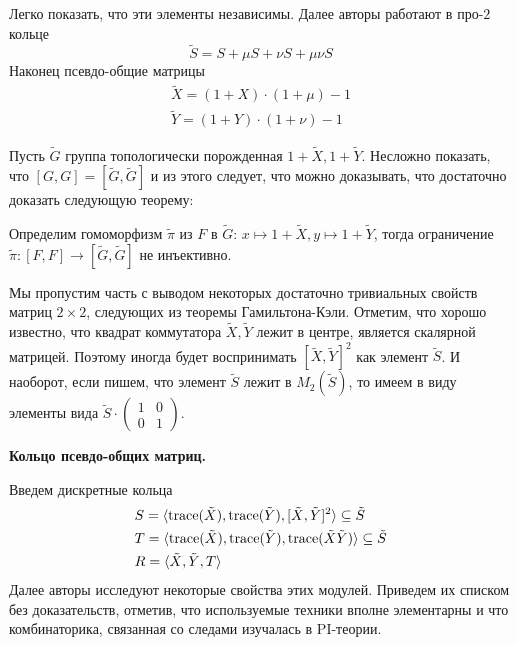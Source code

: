 Легко показать, что эти элементы независимы.
Далее авторы работают в про-$2$ кольце
\[
    \tilde{S} = S + \mu S + \nu S + \mu \nu S
\]
Наконец псевдо-общие матрицы
\begin{gather*}
    \tilde{X} = (1 + X) \cdot (1 + \mu) - 1 \\
    \tilde{Y} = (1 + Y) \cdot (1 + \nu) - 1
\end{gather*}

Пусть $\tilde{G}$ группа топологически порожденная $1 + \tilde{X}, 1 + \tilde{Y}$.
Несложно показать, что $[G, G] = [\tilde{G}, \tilde{G}]$ и из этого следует, что можно доказывать, что достаточно доказать следующую теорему:
\vskip 0.1in\noindent
\begin{theorem}
    Определим гомоморфизм $\tilde{\pi}$ из $F$ в $\tilde{G}$: $x\mapsto 1 + \tilde{X}, y\mapsto 1 + \tilde{Y}$, тогда ограничение $\tilde{\pi}: [F, F] \to [\tilde{G}, \tilde{G}]$ не инъективно.
\end{theorem}

Мы пропустим часть с выводом некоторых достаточно тривиальных свойств матриц $2\times 2$, следующих из теоремы Гамильтона-Кэли.
Отметим, что хорошо известно, что квадрат коммутатора $\tilde{X}, \tilde{Y}$ лежит в центре, является скалярной матрицей.
Поэтому иногда будет воспринимать $[\tilde{X},\tilde{Y}]^2$ как элемент $\tilde{S}$.
И наоборот, если пишем, что элемент $\tilde{S}$ лежит в $M_2(\tilde{S})$, то имеем в виду элементы вида $\tilde{S} \cdot
\begin{pmatrix}
    1 & 0 \\
    0 & 1
\end{pmatrix}$.

\vskip 0.1in\noindent
{\large\textbf{Кольцо псевдо-общих матриц.}}

Введем дискретные кольца
\begin{align*}
    & S = \langle \mathrm{trace}(\tilde{X}), \mathrm{trace}(\tilde{Y}), [\tilde{X}, \tilde{Y}]^2 \rangle \subseteq \tilde{S} \\
    & T = \langle \mathrm{trace}(\tilde{X}), \mathrm{trace}(\tilde{Y}), \mathrm{trace}(\tilde{X}\tilde{Y}) \rangle \subseteq \tilde{S} \\
    & R = \langle \tilde{X}, \tilde{Y}, T \rangle
\end{align*}
Далее авторы исследуют некоторые свойства этих модулей.
Приведем их списком без доказательств, отметив, что используемые техники вполне элементарны и что комбинаторика, связанная со следами изучалась в PI-теории.

